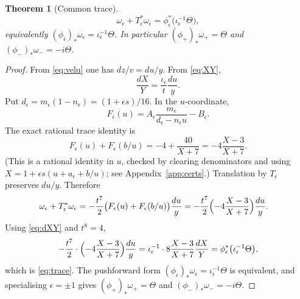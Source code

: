 \documentclass[11pt,a4paper]{article}
\newtheorem{theorem}{Theorem}[section]
\theoremstyle{definition}
\theoremstyle{remark}
\begin{document}
\begin{theorem}[Common trace]
\label{thm:trace}
\begin{equation}
\boxed{
\omega_\epsilon+T_\epsilon^*\omega_\epsilon
=
\phi_\epsilon^*\bigl(\iota_\epsilon^{-1}\Theta\bigr),
}
\label{eq:trace}
\end{equation}
equivalently \((\phi_\epsilon)_*\omega_\epsilon=\iota_\epsilon^{-1}\Theta\). In
particular \((\phi_+)_*\omega_+=\Theta\) and
\((\phi_-)_*\omega_-=-i\Theta\).
\end{theorem}

\begin{proof}
From \eqref{eq:velu} one has \(dz/v=du/y\). From \eqref{eq:XY},
\begin{equation}
\frac{dX}{Y}
=
\frac{\iota_\epsilon}{t}\frac{du}{y}.
\label{eq:dXY}
\end{equation}
Put \(d_\epsilon=m_\epsilon(1-n_\epsilon)=(1+\epsilon s)/16\). In the
\(u\)-coordinate,
\begin{equation}
F_\epsilon(u)
=
A_\epsilon\frac{m_\epsilon}{d_\epsilon-n_\epsilon u}-B_\epsilon.
\label{eq:Fu}
\end{equation}
The exact rational trace identity is
\begin{equation}
\boxed{
F_\epsilon(u)+F_\epsilon(b/u)
=
-4+\frac{40}{X+7}
=
-4\frac{X-3}{X+7}.
}
\label{eq:Ftrace}
\end{equation}
(This is a rational identity in \(u\), checked by clearing denominators and using
\(X=1+\epsilon s(u+a_\epsilon+b/u)\); see Appendix~\ref{app:certs}.) Translation
by \(T_\epsilon\) preserves \(du/y\). Therefore
\begin{align*}
\omega_\epsilon+T_\epsilon^*\omega_\epsilon
&=
-\frac{t^7}{2}\bigl(F_\epsilon(u)+F_\epsilon(b/u)\bigr)\frac{du}{y}
=
-\frac{t^7}{2}\Bigl(-4\frac{X-3}{X+7}\Bigr)\frac{du}{y}.
\end{align*}
Using \eqref{eq:dXY} and \(t^8=4\),
\[
-\frac{t^7}{2}\cdot\Bigl(-4\frac{X-3}{X+7}\Bigr)\frac{du}{y}
=
\iota_\epsilon^{-1}\cdot 8\frac{X-3}{X+7}\frac{dX}{Y}
=
\phi_\epsilon^*\bigl(\iota_\epsilon^{-1}\Theta\bigr),
\]
which is \eqref{eq:trace}. The pushforward form
\((\phi_\epsilon)_*\omega_\epsilon=\iota_\epsilon^{-1}\Theta\) is equivalent, and
specialising \(\epsilon=\pm1\) gives
\((\phi_+)_*\omega_+=\Theta\) and \((\phi_-)_*\omega_-=-i\Theta\).
\end{proof}
\end{document}
